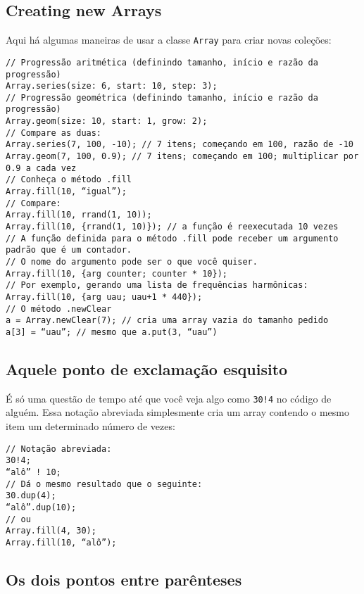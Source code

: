 \subsection{Creating new Arrays}

Aqui há algumas maneiras de usar a classe \texttt{Array} para criar novas coleções:

\begin{lstlisting}[style=SuperCollider-IDE, basicstyle=\scttfamily\footnotesize]
// Progressão aritmética (definindo tamanho, início e razão da progressão)
Array.series(size: 6, start: 10, step: 3);
// Progressão geométrica (definindo tamanho, início e razão da progressão)
Array.geom(size: 10, start: 1, grow: 2);
// Compare as duas:
Array.series(7, 100, -10); // 7 itens; começando em 100, razão de -10
Array.geom(7, 100, 0.9); // 7 itens; começando em 100; multiplicar por 0.9 a cada vez
// Conheça o método .fill
Array.fill(10, “igual”);
// Compare:
Array.fill(10, rrand(1, 10)); 
Array.fill(10, {rrand(1, 10)}); // a função é reexecutada 10 vezes
// A função definida para o método .fill pode receber um argumento padrão que é um contador.
// O nome do argumento pode ser o que você quiser.
Array.fill(10, {arg counter; counter * 10});
// Por exemplo, gerando uma lista de frequências harmônicas:
Array.fill(10, {arg uau; uau+1 * 440}); 
// O método .newClear
a = Array.newClear(7); // cria uma array vazia do tamanho pedido
a[3] = “uau”; // mesmo que a.put(3, “uau”)
\end{lstlisting}


\subsection{Aquele ponto de exclamação esquisito}

É só uma questão de tempo até que você veja algo como \texttt{30!4} no código de alguém. Essa notação abreviada simplesmente cria um array contendo o mesmo item um determinado número de vezes:

 
\begin{lstlisting}[style=SuperCollider-IDE, basicstyle=\scttfamily\footnotesize]
// Notação abreviada:
30!4;
“alô” ! 10;
// Dá o mesmo resultado que o seguinte:
30.dup(4);
“alô”.dup(10);
// ou
Array.fill(4, 30);
Array.fill(10, “alô”);
\end{lstlisting}
 

\subsection{Os dois pontos entre parênteses}

